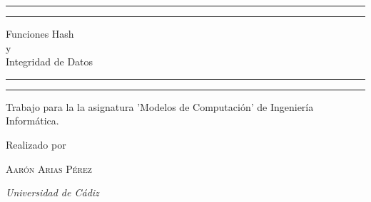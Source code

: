 \documentclass[a4paper, 12pt]{article} %
\begin{document}
\newpage
\begin{titlepage}

	\centering %

	\scshape %

	\vspace*{\baselineskip} %


	\rule{\textwidth}{1.6pt}\vspace*{-\baselineskip}\vspace*{2pt} %
	\rule{\textwidth}{0.4pt} %

	\vspace{0.75\baselineskip} %

	{\LARGE Funciones Hash\\y\\Integridad de Datos\\} %

	\vspace{0.75\baselineskip} %

	\rule{\textwidth}{0.4pt}\vspace*{-\baselineskip}\vspace{3.2pt} %
	\rule{\textwidth}{1.6pt} %

	\vspace{2\baselineskip} %


	Trabajo para la la asignatura 'Modelos de Computación' de Ingeniería Informática.

	\vspace*{3\baselineskip} %


	Realizado por

	\vspace{0.5\baselineskip} %

	{\scshape\Large Aarón Arias Pérez\\} %

	\vspace{0.5\baselineskip} %

	\textit{Universidad de Cádiz} %

\end{titlepage}
\end{document}
